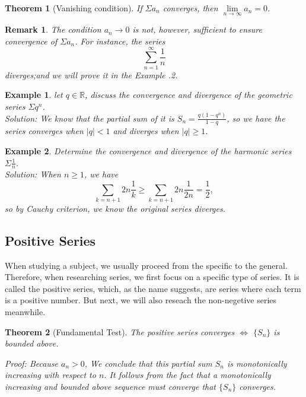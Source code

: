 \documentclass[12pt]{article}
\theoremstyle{oneline}
\newtheorem{theorem}{Theorem}[subsection]
\newtheorem{remark}{Remark}[subsection]
\newtheorem{example}{Example}[subsection]
\theoremstyle{twoline}
\begin{document}
\begin{theorem}[Vanishing condition]
  If $\Sigma a_n$ converges, then $\lim\limits_{n\to\infty}a_n=0$.
\end{theorem}

\begin{remark}
  The condition $a_n\to0$ is not, however, sufficient to ensure convergence of $\Sigma a_n$. For instance, the series 
  \[\sum\limits_{n=1}^\infty \frac1n\]
  diverges;and we will prove it in the \textit{Example \thesubsection.2}.
\end{remark}

\begin{example}
  let $q\in\mathbb{R}$, discuss the convergence and divergence of the geometric series $\Sigma q^n$.\\
\textit{Solution:} We know that the partial sum of it is $S_n=\frac{q(1-q^n)}{1-q}$, so we have the series converges when $|q|<1$ and diverges when $|q|\geq1$.
\end{example}

\begin{example}
  Determine the convergence and divergence of the harmonic series $\Sigma \frac1n$.\\
  \textit{Solution:} When $n\geq 1$, we have
  \[\sum\limits_{k=n+1}{2n}\frac1k\geq\sum\limits_{k=n+1}{2n}\frac1{2n}=\frac12,\]
  so by Cauchy criterion, we know the original series diverges.
\end{example}

\subsection{Positive Series}
\introduction
\hspace*{2em}
When studying a subject, we usually proceed from the specific to the general. Therefore, when researching series, we first focus on a specific type of series. It is called the positive series, which, as the name suggests, are series where each term is a positive number. But next, we will also reseach the non-negetive series meanwhile.

\begin{theorem}[Fundamental Test]
  The positive series converges $\iff$ $\{S_n\}$ is bounded above.

\textit{Proof:} Because $a_n>0$, We conclude that this partial sum $S_n$ is monotonically increasing with respect to $n$. It follows from the fact that a monotonically increasing and bounded above sequence must converge that $\{S_n\}$ converges.
\end{theorem}
\end{document}

